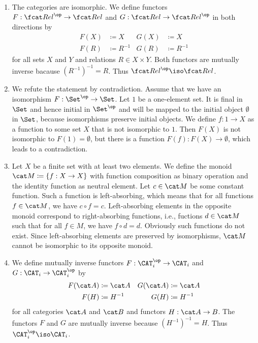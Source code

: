 \begin{answer}
  \begin{enumerate}
    \item The categories are isomorphic.
      We define functors $F : \Rel^\op \to \Rel$ and $G : \Rel \to \Rel^\op$ in both directions by
      \begin{align*}
        F(X) &\coloneqq X  &  G(X) &\coloneqq X \\
        F(R) &\coloneqq R^{-1}  &  G(R) &\coloneqq R^{-1}
      \end{align*}
      for all sets $X$ and $Y$ and relations $R \in X \times Y$.
      Both functors are mutually inverse bacause $(R^{-1})^{-1} = R$.
      Thus $\Rel^\op \iso \Rel$.

    \item We refute the statement by contradiction.
      Assume that we have an isomorphism $F : \Set^\op \to \Set$.
      Let $1$ be a one-element set.
      It is final in $\Set$ and hence initial in $\Set^\op$ and will be mapped to the initial object $\emptyset$ in $\Set$, because isomorphisms preserve initial objects.
      We define $f : 1 \to X$ as a function to some set $X$ that is not isomorphic to $1$.
      Then $F(X)$ is not isomorphic to $F(1) = \emptyset$, but there is a function $F(f) : F(X) \to \emptyset$, which leads to a contradiction.

    \item Let $X$ be a finite set with at least two elements.
      We define the monoid $\M \coloneqq \lbrace f : X \to X \rbrace$ with function composition as binary operation and the identity function as neutral element.
      Let $c \in \M$ be some constant function.
      Such a function is left-absorbing, which means that for all functions $f \in \M$, we have $c \circ f = c$.
      Left-absorbing elements in the opposite monoid correspond to right-absorbing functions, i.e., fuctions $d \in \M$ such that for all $f \in M$, we have $f \circ d = d$.
      Obviously such functions do not exist.
      Since left-absorbing elements are preserved by isomorphisms, $\M$ cannot be isomorphic to its opposite monoid.

    \item We define mutually inverse functors $F : \CAT_i^\op \to \CAT_i$ and $G : \CAT_i \to \CAT_i^\op$ by
      \begin{align*}
        F(\A) &\coloneqq \A  &  G(\A) &\coloneqq \A \\
        F(H) &\coloneqq H^{-1}  &  G(H) &\coloneqq H^{-1}
      \end{align*}
      for all categories $\A$ and $\B$ and functors $H : \A \to B$.
      The functors $F$ and $G$ are mutually inverse because $(H^{-1})^{-1} = H$.
      Thus $\CAT_i^\op \iso \CAT_i$.
  \end{enumerate}
\end{answer}

